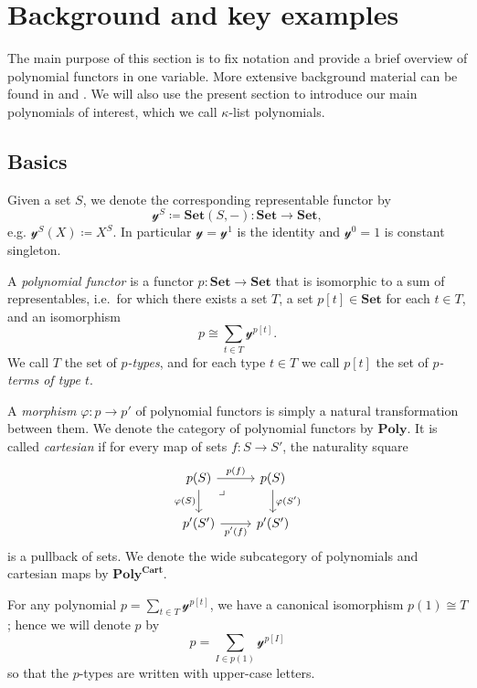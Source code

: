 \documentclass[11pt, one side, article]{memoir}
\theoremstyle{definition}
\theoremstyle{plain}
\newenvironment{definition}
  {\pushQED{\qed}\renewcommand{\qedsymbol}{$\lozenge$}\definitionx}
  {\popQED\enddefinitionx}
\newcommand{\Cat}[1]{\mathbf{#1}}%
\newcommand{\smset}{\Cat{Set}}
\newcommand{\yon}{\mathcal{y}}
\newcommand{\poly}{\Cat{Poly}}
\newcommand{\polycart}{\poly^{\Cat{Cart}}}
\newcommand{\0}{\textsf{0}}
\newcommand{\1}{\tn{\textsf{1}}}
\begin{document}
\chapter{Background and key examples}

The main purpose of this section is to fix notation and provide a brief overview of polynomial functors in one variable. More extensive background material can be found in \cite{spivak2022poly} and \cite{kock2012polynomial}. We will also use the present section to introduce our main polynomials of interest, which we call $\kappa$-list polynomials.

\section{Basics}

\begin{definition}[Polynomial functor]\label{def.poly}
Given a set $S$, we denote the corresponding representable functor by
\[\yon^S\coloneqq\smset(S,-)\colon\smset\to\smset,\]
e.g. $\yon^S(X)\coloneqq X^S$. In particular $\yon=\yon^1$ is the identity and $\yon^0=1$ is constant singleton.

A \emph{polynomial functor} is a functor $p\colon\smset\to\smset$ that is isomorphic to a sum of representables, i.e.\ for which there exists a set $T$, a set $p[t]\in\smset$ for each $t\in T$, and an isomorphism
\[
p\cong\sum_{t\in T}\yon^{p[t]}.
\]
We call $T$ the set of \emph{$p$-types}, and for each type $t\in T$ we call $p[t]$ the set of \emph{$p$-terms of type $t$}. 

A \emph{morphism} $\varphi\colon p\to p'$ of polynomial functors is simply a natural transformation between them. We denote the category of polynomial functors by $\poly$. It is called \emph{cartesian} if for every map of sets $f\colon S\to S'$, the naturality square
\[
\begin{tikzcd}
  p(S)\ar[r, "p(f)"]\ar[d, "\varphi(S)"']&p(S)\ar[d, "\varphi(S')"]\\
  p'(S')\ar[r, "p'(f)"']&p'(S')\ar[ul, phantom, very near end, "\lrcorner"]
\end{tikzcd}
\]
is a pullback of sets. We denote the wide subcategory of polynomials and cartesian maps by $\polycart$.
\end{definition}

For any polynomial $p=\sum_{t\in T}\yon^{p[t]}$, we have a canonical isomorphism $p(1)\cong T$; hence we will denote $p$ by
\begin{equation}\label{eqn.poly_notation}
p=\sum_{I\in p(1)}\yon^{p[I]}
\end{equation}
so that the $p$-types are written with upper-case letters.
\end{document}
